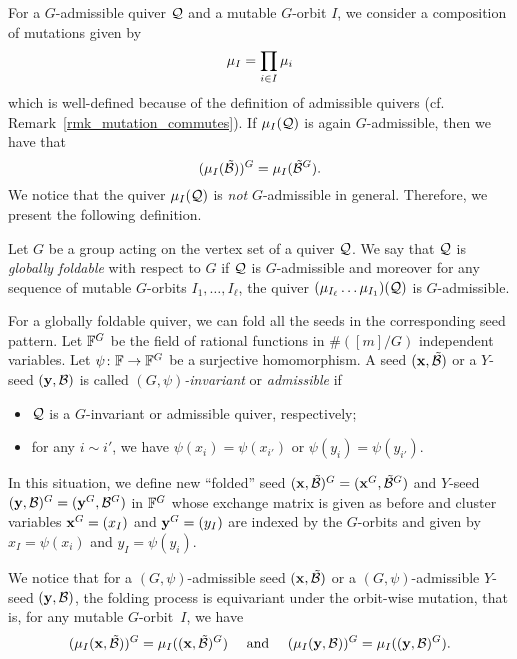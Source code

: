 For a $G$-admissible quiver $\mathcal{Q}$ and a mutable $G$-orbit $I$, we
consider a composition of mutations given by
\[
    \mu_I = \prod_{i \in I} \mu_i
\]
which is well-defined because of the definition of admissible quivers (cf. Remark~\ref{rmk_mutation_commutes}).
If $\mu_I(\mathcal{Q})$ is again $G$-admissible, then we have that
\begin{equation*}%
    (\mutation_I(\qbasis))^G = \mutation_I(\qbasis^G).
\end{equation*}
We notice that the quiver $\mu_I(\mathcal{Q})$ is \textit{not}
$G$-admissible in general. Therefore, we present the following definition.
\begin{definition}
    Let $G$ be a group acting on the vertex set of a quiver $\mathcal{Q}$.
    We say that $\mathcal{Q}$ is \emph{globally foldable} with respect to $G$ if
    $\mathcal{Q}$ is $G$-admissible and moreover for any sequence of mutable
    $G$-orbits $I_1,\dots,I_\ell$, the quiver $(\mu_{I_\ell}  \dots
     \mu_{I_1})(\mathcal{Q})$ is $G$-admissible.
\end{definition}
For a globally foldable quiver, we can fold all the seeds in the
corresponding seed pattern. Let
$\mathbb{F}^G$ be the field of rational functions in $\# ([m]/G)$ independent variables.
Let $\psi \colon \mathbb{F} \to \mathbb{F}^G$ be a surjective 
homomorphism.
A seed $(\mathbf{x}, \mathcal{\tilde{B}})$ or a $Y$-seed $(\mathbf{y}, \mathcal{B})$ is called \emph{$(G, \psi)$-invariant} or \emph{admissible} if 
\begin{itemize}
    \item $\mathcal{Q}$ is a $G$-invariant or admissible quiver, respectively;
    \item for any $i \sim i'$, we have $\psi(x_i) = \psi(x_{i'})$ or $\psi(y_i) = \psi(y_{i'})$.
\end{itemize} 
In this situation, we define new ``folded'' seed $(\mathbf{x},\mathcal{\tilde{B}})^G = (\mathbf{x}^G,
\mathcal{\tilde{B}}^G)$ and $Y$-seed $(\mathbf{y},\mathcal{B})^G=(\mathbf{y}^G, \mathcal{B}^G)$ in $\mathbb{F}^G$ whose exchange matrix is given as before
and cluster variables $\mathbf{x}^G = (x_I)$ and $\mathbf{y}^G=(y_I)$ are indexed by the $G$-orbits and
given by $x_I = \psi(x_i)$ and $y_I=\psi(y_i)$.

We notice that for a $(G,\psi)$-admissible seed $(\mathbf{x}, \mathcal{\tilde{B}})$ or a $(G,\psi)$-admissible $Y$-seed $(\mathbf{y}, \mathcal{B})$, the folding process is equivariant under the orbit-wise mutation, that is, for any mutable $G$-orbit~$I$, we have
\[
(\mu_I(\mathbf{x},\mathcal{\tilde{B}}))^G = \mu_{I}((\mathbf{x},\mathcal{\tilde{B}})^G) \quad 
\text{ and } \quad
(\mu_I(\mathbf{y},\mathcal{B}))^G = \mu_{I}((\mathbf{y},\mathcal{B})^G).
\]


